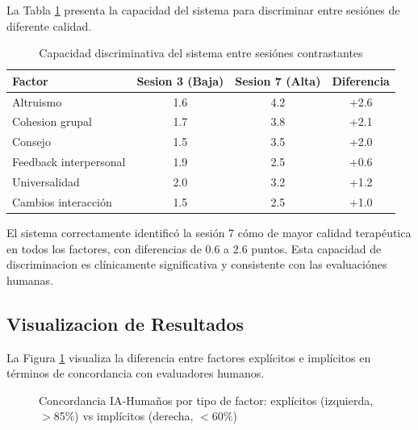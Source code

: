 \documentclass[12pt,a4paper,twoside]{book}
\begin{document}
La Tabla \ref{tab:comparación_sesiónes} presenta la capacidad del sistema para discriminar entre sesiónes de diferente calidad.

\begin{table}[h]
\centering
\caption{Capacidad discriminativa del sistema entre sesiónes contrastantes}
\label{tab:comparación_sesiónes}
\begin{tabular}{lccc}
\toprule
\textbf{Factor} & \textbf{Sesion 3 (Baja)} & \textbf{Sesion 7 (Alta)} & \textbf{Diferencia} \\
\midrule
Altruismo & 1.6 & 4.2 & +2.6 \\
Cohesion grupal & 1.7 & 3.8 & +2.1 \\
Consejo & 1.5 & 3.5 & +2.0 \\
Feedback interpersonal & 1.9 & 2.5 & +0.6 \\
Universalidad & 2.0 & 3.2 & +1.2 \\
Cambios interacción & 1.5 & 2.5 & +1.0 \\
\bottomrule
\end{tabular}
\end{table}

El sistema correctamente identificó la sesión 7 cómo de mayor calidad terapéutica en todos los factores, con diferencias de 0.6 a 2.6 puntos. Esta capacidad de discriminacion es clínicamente significativa y consistente con las evaluaciónes humanas.

\subsection{Visualizacion de Resultados}

La Figura \ref{fig:concordancia_gráfico} visualiza la diferencia entre factores explícitos e implícitos en términos de concordancia con evaluadores humanos.

\begin{figure}[h]
\centering
{}
\caption{Concordancia IA-Humaños por tipo de factor: explícitos (izquierda, $>$85\%) vs implícitos (derecha, $<$60\%)}
\label{fig:concordancia_gráfico}
\end{figure}
\end{document}

